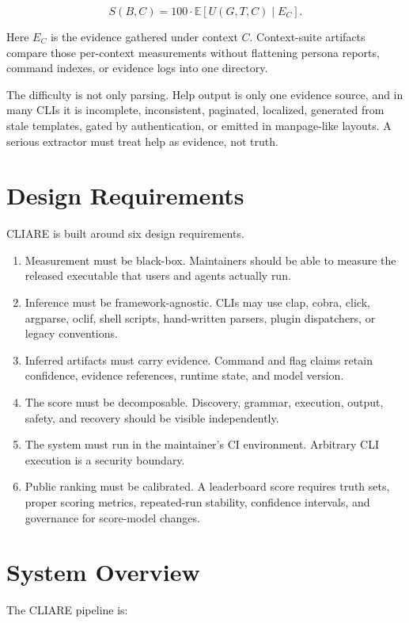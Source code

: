 \documentclass[11pt]{article}
\begin{document}
\[
S(B, C) = 100 \cdot \mathbb{E}[U(G, T, C) \mid E_C].
\]

Here \(E_C\) is the evidence gathered under context \(C\). Context-suite artifacts compare those per-context measurements without flattening persona reports, command indexes, or evidence logs into one directory.

The difficulty is not only parsing. Help output is only one evidence source, and in many CLIs it is incomplete, inconsistent, paginated, localized, generated from stale templates, gated by authentication, or emitted in manpage-like layouts. A serious extractor must treat help as evidence, not truth.

\section{Design Requirements}

CLIARE is built around six design requirements.

\begin{enumerate}
  \item Measurement must be black-box. Maintainers should be able to measure the released executable that users and agents actually run.
  \item Inference must be framework-agnostic. CLIs may use clap, cobra, click, argparse, oclif, shell scripts, hand-written parsers, plugin dispatchers, or legacy conventions.
  \item Inferred artifacts must carry evidence. Command and flag claims retain confidence, evidence references, runtime state, and model version.
  \item The score must be decomposable. Discovery, grammar, execution, output, safety, and recovery should be visible independently.
  \item The system must run in the maintainer's CI environment. Arbitrary CLI execution is a security boundary.
  \item Public ranking must be calibrated. A leaderboard score requires truth sets, proper scoring metrics, repeated-run stability, confidence intervals, and governance for score-model changes.
\end{enumerate}

\section{System Overview}

The CLIARE pipeline is:
\end{document}
